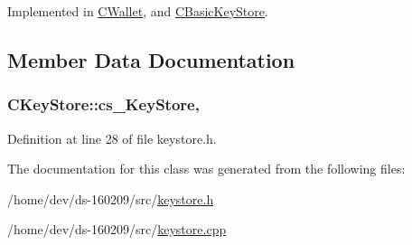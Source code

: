 Implemented in \hyperlink{class_c_wallet_a5be12b9afcf63079b8c009038843b5a2}{C\+Wallet}, and \hyperlink{class_c_basic_key_store_a20c0eccf943d6d16e24c6e2fb63fb527}{C\+Basic\+Key\+Store}.



\subsection{Member Data Documentation}
\hypertarget{class_c_key_store_a386524ff4a00959b81c195cb39fe307d}{}
\subsubsection[{cs\+\_\+\+Key\+Store}]{ C\+Key\+Store\+::cs\+\_\+\+Key\+Store\hspace{0.3cm}{\ttfamily [mutable]}, {\ttfamily [protected]}}\label{class_c_key_store_a386524ff4a00959b81c195cb39fe307d}


Definition at line 28 of file keystore.\+h.



The documentation for this class was generated from the following files\+:\begin{DoxyCompactItemize}
\item 
/home/dev/ds-\/160209/src/\hyperlink{keystore_8h}{keystore.\+h}\item 
/home/dev/ds-\/160209/src/\hyperlink{keystore_8cpp}{keystore.\+cpp}\end{DoxyCompactItemize}
